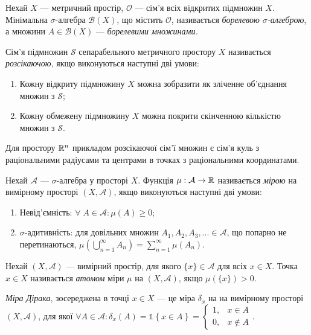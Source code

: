 \begin{definition}
    Нехай $X$ --- метричний простір, $\mathcal{O}$ ---
    сім'я всіх відкритих підмножин $X$. Мінімальна $\sigma$-алгебра
    $\mathcal{B}(X)$, що містить $\mathcal{O}$, називається
    \emph{борелевою $\sigma$-алгеброю}, а множини
    $A \in \mathcal{B}(X)$ --- \emph{борелевими множинами.}
\end{definition}
\begin{definition}
    Сім'я підмножин $\mathcal{S}$ сепарабельного метричного простору $X$ називається
    \emph{розсікаючою}, якщо виконуються наступні дві умови:
    \begin{enumerate}
        \item Кожну відкриту підмножину $X$ можна зобразити як зліченне об'єднання множин з $\mathcal{S}$;
        \item Кожну обмежену підмножину $X$ можна покрити скінченною кількістю множин з $\mathcal{S}$.
    \end{enumerate}
    Для простору $\mathbb{R}^n$ прикладом розсікаючої сім'ї множин є сім'я куль з
    раціональними радіусами та центрами в точках з раціональними координатами.
\end{definition}
\begin{definition}
    Нехай $\mathcal{A}$ --- $\sigma$-алгебра
    у просторі $X$. Функція $\mu: \mathcal{A} \to \mathbb{R}$ називається
    \emph{мірою} на вимірному просторі $\left(X, \mathcal{A}\right)$, якщо виконуються наступні дві умови:
    \begin{enumerate}
        \item Невід'ємність: $\forall \; A \in \mathcal{A} : \mu(A) \geq 0$;
        \item $\sigma$-адитивність: для довільних множин $A_1, A_2, A_3, ... \in \mathcal{A}$,
        що попарно не перетинаються, 
        $\mu\left(\bigcup_{n=1}^{\infty} A_n\right) = \sum_{n=1}^{\infty}\mu(A_n)$.
    \end{enumerate}
\end{definition}
\begin{definition}
    Нехай $\left(X, \mathcal{A}\right)$ --- вимірний простір, для якого $\{ x \} \in \mathcal{A}$
    для всіх $x \in X$.
    Точка $x \in X$ називається \emph{атомом} міри $\mu$ на
    $\left(X, \mathcal{A}\right)$, якщо $\mu\left(\{x \}\right) > 0$.
\end{definition}
\begin{definition}
    \emph{Міра Дірака}, зосереджена
    в точці $x \in X$ --- це міра $\delta_x$ на 
    на вимірному просторі $\left(X, \mathcal{A}\right)$,
    для якої $\forall A \in \mathcal{A}: \delta_x(A) = \mathds{1}\left\{x \in A\right\} = 
    \begin{cases}
        1, & x \in A \\
        0, & x \notin A
    \end{cases}$.
\end{definition}
